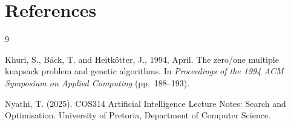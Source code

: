 \documentclass[12pt, a4paper]{article}
\begin{document}
\section*{References}

\begin{thebibliography}{9}

Khuri, S., B\"{a}ck, T. and Heitk\"{o}tter, J., 1994, April.
The zero/one multiple knapsack problem and genetic algorithms.
In \textit{Proceedings of the 1994 ACM Symposium on Applied Computing}
(pp.\ 188--193).

Nyathi, T. (2025).
COS314 Artificial Intelligence Lecture Notes: Search and Optimisation.
University of Pretoria, Department of Computer Science.

\end{thebibliography}
\end{document}
